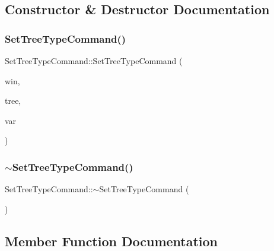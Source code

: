 \subsection{Constructor \& Destructor Documentation}
\mbox{\label{class_set_tree_type_command_a0451d9a9db5db51b504720fcd5821f2a}} 
\subsubsection{\texorpdfstring{SetTreeTypeCommand()}{SetTreeTypeCommand()}}
{\footnotesize\ttfamily Set\+Tree\+Type\+Command\+::\+Set\+Tree\+Type\+Command (\begin{DoxyParamCaption}\item[{\mbox{\hyperlink{class_dt_editor_window}{Dt\+Editor\+Window}} $\ast$}]{win,  }\item[{std\+::shared\+\_\+ptr$<$ \mbox{\hyperlink{classdtree_1_1_decision_tree}{dtree\+::\+Decision\+Tree}} $>$}]{tree,  }\item[{\mbox{\hyperlink{classdtree_1_1_decision_tree_manager_a14180eb59d2c245ce3af1c27ddb0846d}{dtree\+::\+Decision\+Tree\+Manager\+::\+Tree\+Type}}}]{var }\end{DoxyParamCaption})}

\mbox{\label{class_set_tree_type_command_ad16e3c8044c133c632f27921d18d2dbf}} 
\subsubsection{\texorpdfstring{$\sim$SetTreeTypeCommand()}{~SetTreeTypeCommand()}}
{\footnotesize\ttfamily Set\+Tree\+Type\+Command\+::$\sim$\+Set\+Tree\+Type\+Command (\begin{DoxyParamCaption}{ }\end{DoxyParamCaption})\hspace{0.3cm}{\ttfamily [virtual]}}



\subsection{Member Function Documentation}
\mbox{\label{class_set_tree_type_command_af11ff06bfd5b1068828ba3d1702d291e}} 
